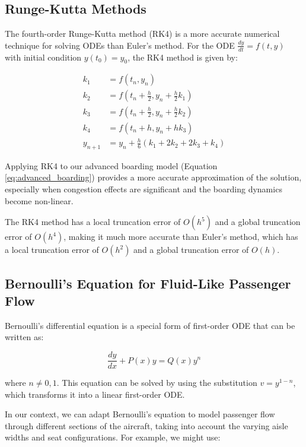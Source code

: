 \documentclass[12pt,a4paper]{article}
\begin{document}
\subsection{Runge-Kutta Methods}

The fourth-order Runge-Kutta method (RK4) is a more accurate numerical technique for solving ODEs than Euler's method. For the ODE $\frac{dy}{dt} = f(t, y)$ with initial condition $y(t_0) = y_0$, the RK4 method is given by:

\begin{align}
k_1 &= f(t_n, y_n) \\
k_2 &= f(t_n + \frac{h}{2}, y_n + \frac{h}{2} k_1) \\
k_3 &= f(t_n + \frac{h}{2}, y_n + \frac{h}{2} k_2) \\
k_4 &= f(t_n + h, y_n + h k_3) \\
y_{n+1} &= y_n + \frac{h}{6}(k_1 + 2k_2 + 2k_3 + k_4)
\label{eq:rk4}
\end{align}

Applying RK4 to our advanced boarding model (Equation \ref{eq:advanced_boarding}) provides a more accurate approximation of the solution, especially when congestion effects are significant and the boarding dynamics become non-linear.

The RK4 method has a local truncation error of $O(h^5)$ and a global truncation error of $O(h^4)$, making it much more accurate than Euler's method, which has a local truncation error of $O(h^2)$ and a global truncation error of $O(h)$.

\subsection{Bernoulli's Equation for Fluid-Like Passenger Flow}

Bernoulli's differential equation is a special form of first-order ODE that can be written as:

\begin{equation}
\frac{dy}{dx} + P(x)y = Q(x)y^n
\label{eq:bernoulli}
\end{equation}

where $n \neq 0, 1$. This equation can be solved by using the substitution $v = y^{1-n}$, which transforms it into a linear first-order ODE.

In our context, we can adapt Bernoulli's equation to model passenger flow through different sections of the aircraft, taking into account the varying aisle widths and seat configurations. For example, we might use:
\end{document}
